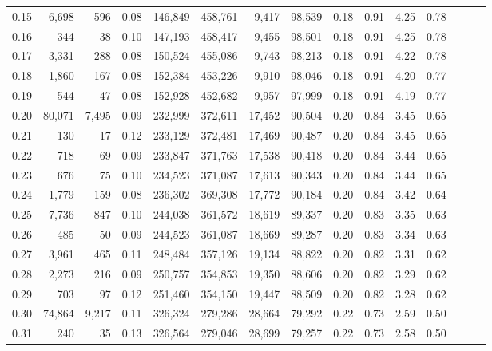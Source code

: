 \begin{tabular}{rrrrrrrrrrrrrrr}
0.15 &   6,698 &     596 &  0.08 &  146,849 &  458,761 &    9,417 &   98,539 &  0.18 &  0.91 &  4.25 &      0.78 \\
0.16 &     344 &      38 &  0.10 &  147,193 &  458,417 &    9,455 &   98,501 &  0.18 &  0.91 &  4.25 &      0.78 \\
0.17 &   3,331 &     288 &  0.08 &  150,524 &  455,086 &    9,743 &   98,213 &  0.18 &  0.91 &  4.22 &      0.78 \\
0.18 &   1,860 &     167 &  0.08 &  152,384 &  453,226 &    9,910 &   98,046 &  0.18 &  0.91 &  4.20 &      0.77 \\
0.19 &     544 &      47 &  0.08 &  152,928 &  452,682 &    9,957 &   97,999 &  0.18 &  0.91 &  4.19 &      0.77 \\
0.20 &  80,071 &   7,495 &  0.09 &  232,999 &  372,611 &   17,452 &   90,504 &  0.20 &  0.84 &  3.45 &      0.65 \\
0.21 &     130 &      17 &  0.12 &  233,129 &  372,481 &   17,469 &   90,487 &  0.20 &  0.84 &  3.45 &      0.65 \\
0.22 &     718 &      69 &  0.09 &  233,847 &  371,763 &   17,538 &   90,418 &  0.20 &  0.84 &  3.44 &      0.65 \\
0.23 &     676 &      75 &  0.10 &  234,523 &  371,087 &   17,613 &   90,343 &  0.20 &  0.84 &  3.44 &      0.65 \\
0.24 &   1,779 &     159 &  0.08 &  236,302 &  369,308 &   17,772 &   90,184 &  0.20 &  0.84 &  3.42 &      0.64 \\
0.25 &   7,736 &     847 &  0.10 &  244,038 &  361,572 &   18,619 &   89,337 &  0.20 &  0.83 &  3.35 &      0.63 \\
0.26 &     485 &      50 &  0.09 &  244,523 &  361,087 &   18,669 &   89,287 &  0.20 &  0.83 &  3.34 &      0.63 \\
0.27 &   3,961 &     465 &  0.11 &  248,484 &  357,126 &   19,134 &   88,822 &  0.20 &  0.82 &  3.31 &      0.62 \\
0.28 &   2,273 &     216 &  0.09 &  250,757 &  354,853 &   19,350 &   88,606 &  0.20 &  0.82 &  3.29 &      0.62 \\
0.29 &     703 &      97 &  0.12 &  251,460 &  354,150 &   19,447 &   88,509 &  0.20 &  0.82 &  3.28 &      0.62 \\
0.30 &  74,864 &   9,217 &  0.11 &  326,324 &  279,286 &   28,664 &   79,292 &  0.22 &  0.73 &  2.59 &      0.50 \\
0.31 &     240 &      35 &  0.13 &  326,564 &  279,046 &   28,699 &   79,257 &  0.22 &  0.73 &  2.58 &      0.50 \\

\end{tabular}

